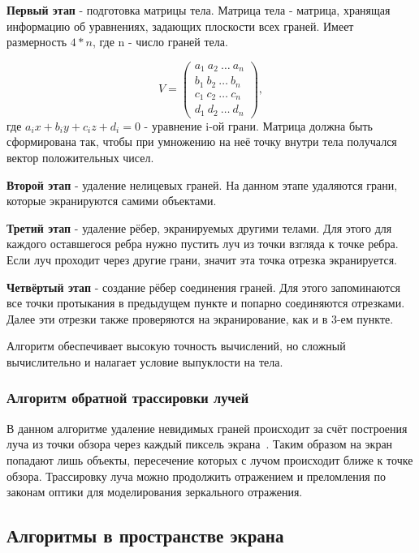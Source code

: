 \textbf{Первый этап} - подготовка матрицы тела. Матрица тела - матрица, хранящая информацию об уравнениях, задающих плоскости всех граней. Имеет размерность $4*n$, где n - число граней тела.

\begin{equation}
	\label{eq:body_matrix}
	V = \begin{pmatrix}
		a_1\ a_2\ \dots\ a_n \\
		b_1\ b_2\ \dots\ b_n \\
		c_1\ c_2\ \dots\ c_n \\
		d_1\ d_2\ \dots\ d_n 
	\end{pmatrix},
\end{equation}
где $ a_ix + b_iy + c_iz + d_i = 0 $ - уравнение i-ой грани. Матрица должна быть сформирована так, чтобы при умножению на неё точку внутри тела получался вектор положительных чисел.

\textbf{Второй этап} - удаление нелицевых граней. На данном этапе удаляются грани, которые экранируются самими объектами.

\textbf{Третий этап} - удаление рёбер, экранируемых другими телами. Для этого для каждого оставшегося ребра нужно пустить луч из точки взгляда к точке ребра. Если луч проходит через другие грани, значит эта точка отрезка экранируется. 

\textbf{Четвёртый этап} - создание рёбер соединения граней. Для этого запоминаются все точки протыкания в предыдущем пункте и попарно соединяются отрезками. Далее эти отрезки также проверяются на экранирование, как и в 3-ем пункте.

Алгоритм обеспечивает высокую точность вычислений, но сложный вычислительно и налагает условие выпуклости на тела.

\subsubsection{Алгоритм обратной трассировки лучей}
В данном алгоритме удаление невидимых граней происходит за счёт построения луча из точки обзора через каждый пиксель экрана~\cite{gabriella}. Таким образом на экран попадают лишь объекты, пересечение которых с лучом происходит ближе к точке обзора. Трассировку луча можно продолжить отражением и преломления по законам оптики для моделирования зеркального отражения.

\subsection*{Алгоритмы в пространстве экрана}
